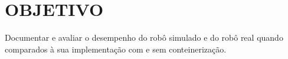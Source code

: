 \section{OBJETIVO}
Documentar e avaliar o desempenho do robô simulado e do robô real quando comparados à sua implementação com e sem conteinerização.

\begin{comment}
\section{ESTRUTURA DO TRABALHO}

O restante deste trabalho é dividido da seguinte maneira: na Seção 2, serão
apresentados todos os conceitos utilizados e relacionados ao tema abordado, para que o leitor possa entender com clareza as técnicas que estão sendo tratadas no trabalho e compreender os termos que serão descritos posteriormente.

Na Seção 3, os trabalhos relacionados disponíveis na literatura, com o objetivo de apresentar o cenário atual de pesquisa da área.
 
A Seção 4 detalhará a metodologia que será utilizada para o desenvolvimento deste trabalho, demonstrando as técnicas que serão utilizadas e os passos a serem realizados para atingir o objetivo final.

O Seção 5 irá expor o que os autores deste trabalho esperam ao longo do desenvolvimento e após a implementação da metodologia proposta.

\end{comment}

